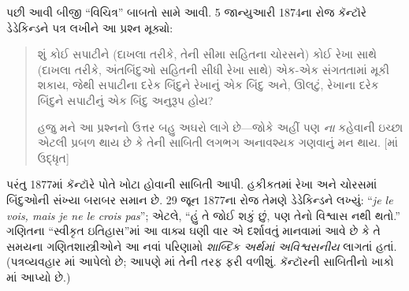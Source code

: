 પછી આવી બીજી “વિચિત્ર” બાબતો સામે આવી.
5 જાન્યુઆરી 1874ના રોજ કૅન્ટૉરે
ડેડેકિન્ડને પત્ર લખીને આ પ્રશ્ન મૂક્યો:
\begin{quote}
શું કોઈ સપાટીને (દાખલા તરીકે, તેની સીમા
સહિતના ચોરસને) કોઈ રેખા સાથે
(દાખલા તરીકે, અંતબિંદુઓ સહિતની
સીધી રેખા સાથે) એક-એક સંગતતામાં
મૂકી શકાય, જેથી સપાટીના દરેક
બિંદુને રેખાનું એક બિંદુ અને,
ઊલટું, રેખાના દરેક બિંદુને
સપાટીનું એક બિંદુ અનુરૂપ હોય?

હજુ મને આ પ્રશ્નનો ઉત્તર બહુ અઘરો લાગે
છે—જોકે અહીં પણ \emph{ના} કહેવાની
ઇચ્છા એટલી પ્રબળ થાય છે કે તેની
સાબિતી લગભગ અનાવશ્યક ગણવાનું
મન થાય. [\citealt{Gouvea2011}માં
ઉદ્ધૃત]
\end{quote}
પરંતુ 1877માં કૅન્ટૉરે પોતે ખોટા
હોવાની સાબિતી આપી. હકીકતમાં
રેખા અને ચોરસમાં બિંદુઓની
સંખ્યા બરાબર સમાન છે.
29 જૂન 1877ના રોજ તેમણે
ડેડેકિન્ડને લખ્યું:
“\emph{je le vois, mais je ne le crois pas}”;
એટલે, “હું તે જોઈ શકું છું,
પણ તેનો વિશ્વાસ નથી થતો.”
ગણિતના “સ્વીકૃત ઇતિહાસ”માં
આ વાક્ય ઘણી વાર એ દર્શાવતું
માનવામાં આવે છે કે તે સમયના
ગણિતશાસ્ત્રીઓને આ નવાં
પરિણામો \emph{શાબ્દિક અર્થમાં
અવિશ્વસનીય} લાગતાં હતાં.
(પત્રવ્યવહાર \citet{Gouvea2011}માં
આપેલો છે; આપણે
માં
તેની તરફ ફરી વળીશું.
કૅન્ટૉરની સાબિતીનો
ખાકો માં
આપ્યો છે.)

